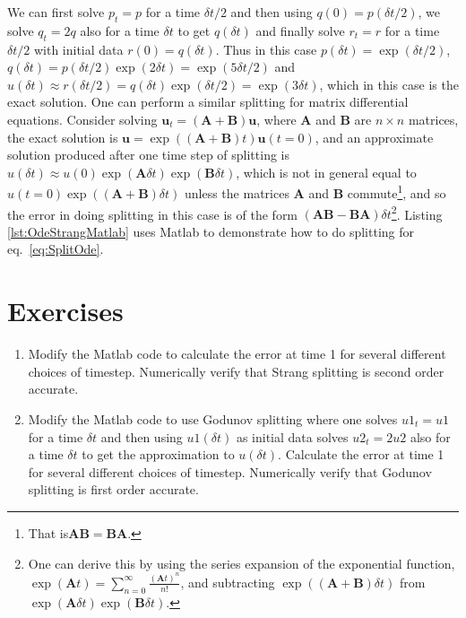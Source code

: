 We can first solve $p_t=p$ for a time $\delta t/2$ and then using $q(0)=p(\delta t/2)$, we solve $q_t=2q$ also for a time $\delta t$ to get $q(\delta t)$ and finally solve $r_t=r$ for a time $\delta t/2$ with initial data $r(0)=q(\delta t)$. Thus in this case $p(\delta t)=\exp(\delta t/2)$, $q(\delta t)=p(\delta t/2)\exp(2\delta t)=\exp(5\delta t/2)$ and $u(\delta t)\approx r(\delta t/2)=q(\delta t)\exp(\delta t/2)=\exp(3\delta t)$, which in this case is the exact solution. One can perform a similar splitting for matrix differential equations. Consider solving $\bm u_t = (\bm A + \bm B)\bm u$, where $\bm A$ and $\bm B$ are $n\times n$ matrices, the exact solution is $\bm u=\exp\left((\bm A + \bm B) t\right)\bm u(t=0)$, and an approximate solution produced after one time step of splitting is $u(\delta t)\approx u(0)\exp(\bm A \delta t)\exp(\bm B \delta t)$, which is not in general equal to $u(t=0)\exp\left((\bm A + \bm B) \delta t\right)$ unless the matrices $\bm A$ and $\bm B$ commute\footnote{That is$\bm A\bm B=\bm B\bm A$.}, and so the error in doing splitting in this case is of the form $(\bm A \bm B - \bm B \bm A)\delta t$\footnote{One can derive this by using the series expansion of the exponential function, $\exp(\bm A t)=\sum_{n=0}^{\infty}\frac{(\bm A t)^n}{n!}$, and subtracting $\exp((\bm A+\bm B)\delta t)$ from $\exp(\bm A \delta t)\exp(\bm B \delta t).$}. Listing \ref{lst:OdeStrangMatlab} uses Matlab to demonstrate how to do splitting for eq.\ \eqref{eq:SplitOde}.



\section{Exercises}

\begin{enumerate}
\item[1)] Modify the Matlab code to calculate the error at time 1 for several different choices of timestep. Numerically verify that Strang splitting is second order accurate.
\item[2)] Modify the Matlab code to use Godunov splitting where one solves $u1_t=u1$ for a time $\delta t$ and then using $u1(\delta t)$ as initial data solves $u2_t=2u2$ also for a time $\delta t$ to get the approximation to $u(\delta t)$. Calculate the error at time 1 for several different choices of timestep. Numerically verify that Godunov splitting is first order accurate.
\end{enumerate}
